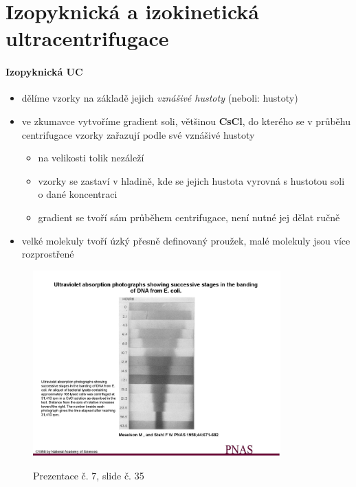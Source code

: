 \documentclass[DIV=8]{scrreprt}
\begin{document}
\section{Izopyknická a izokinetická ultracentrifugace} \label{Izopyknická a izokinetická ultracentrifugace}


\paragraph{Izopyknická UC}
\begin{itemize}[nosep]
    \item dělíme vzorky na základě jejich \emph{vznášivé hustoty} (neboli: hustoty)
    \item ve zkumavce vytvoříme gradient soli, většinou \textbf{CsCl}, do kterého se v průběhu centrifugace vzorky zařazují podle své vznášivé hustoty
\begin{itemize}[nosep]
    \item na velikosti tolik nezáleží
    \item vzorky se zastaví v hladině, kde se jejich hustota vyrovná s hustotou soli o dané koncentraci
    \item gradient se tvoří sám průběhem centrifugace, není nutné jej dělat ručně
\end{itemize}

    \item velké molekuly tvoří úzký přesně definovaný proužek, malé molekuly jsou více rozprostřené
\end{itemize}



\begin{figure}
    \caption{Prezentace č. 7, slide č. 35}
    \includegraphics[width=0.85\textwidth]{slides-7/slide-35.jpg}
    \centering
    \label{slides-7-slide-35}
\end{figure}
\end{document}
